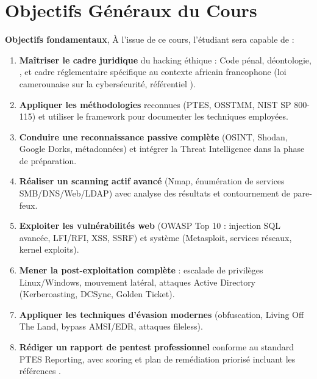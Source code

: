\section*{Objectifs Généraux du Cours}

\begin{boxobjectifs}
\textbf{Objectifs fondamentaux}, À l'issue de ce cours, l'étudiant sera capable de :
\begin{enumerate}
    \item \textbf{Maîtriser le cadre juridique} du hacking éthique : Code pénal,
          déontologie, , et cadre réglementaire spécifique au contexte
          africain francophone (loi camerounaise sur la cybersécurité,
          référentiel ).
    \item \textbf{Appliquer les méthodologies} reconnues (PTES, OSSTMM,
          NIST SP 800-115) et utiliser le framework  pour
          documenter les techniques employées.
    \item \textbf{Conduire une reconnaissance passive complète} (OSINT, Shodan,
          Google Dorks, métadonnées) et intégrer la Threat Intelligence dans la
          phase de préparation.
    \item \textbf{Réaliser un scanning actif avancé} (Nmap, énumération de services
          SMB/DNS/Web/LDAP) avec analyse des résultats et contournement de
          pare-feux.
    \item \textbf{Exploiter les vulnérabilités web} (OWASP Top 10 : injection SQL
          avancée, LFI/RFI, XSS, SSRF) et système (Metasploit, services réseaux,
          kernel exploits).
    \item \textbf{Mener la post-exploitation complète} : escalade de privilèges
          Linux/Windows, mouvement latéral, attaques Active Directory
          (Kerberoasting, DCSync, Golden Ticket).
    \item \textbf{Appliquer les techniques d'évasion modernes} (obfuscation,
          Living Off The Land, bypass AMSI/EDR, attaques fileless).
    \item \textbf{Rédiger un rapport de pentest professionnel} conforme au standard
          PTES Reporting, avec scoring  et plan de remédiation
          priorisé incluant les références .
\end{enumerate}
\end{boxobjectifs}


